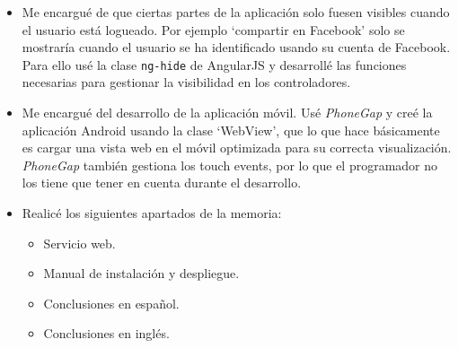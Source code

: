 \begin{itemize}
\item
Me encargué de que ciertas partes de la aplicación solo fuesen visibles cuando el usuario está logueado. Por ejemplo `compartir en Facebook' solo se mostraría cuando el usuario se ha identificado usando su cuenta de Facebook. Para ello usé la clase \texttt{ng-hide} de AngularJS y desarrollé las funciones necesarias para gestionar la visibilidad en los controladores.

\item
Me encargué del desarrollo de la aplicación móvil. Usé \textit{PhoneGap} y creé la aplicación Android usando la clase `WebView', que lo que hace básicamente es cargar una vista web en el móvil optimizada para su correcta visualización. \textit{PhoneGap} también gestiona los touch events, por lo que el programador no los tiene que tener en cuenta durante el desarrollo.

\item
Realicé los siguientes apartados de la memoria:
\begin{itemize}
\item Servicio web.
\item Manual de instalación y despliegue.
\item Conclusiones en español.
\item Conclusiones en inglés.

\end{itemize}



\end{itemize}
